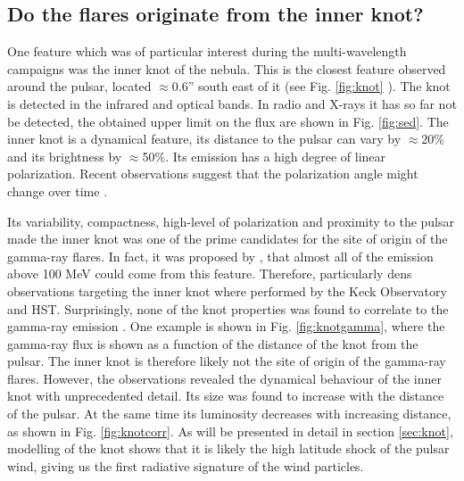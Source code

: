 \subsection{Do the flares originate from the inner knot?}
One feature which was of particular interest during the multi-wavelength campaigns was the inner knot of the nebula. This is the closest feature observed around the pulsar, located $\approx$0.6'' south east of it (see Fig. \ref{fig:knot} ). The knot is detected in the infrared and optical bands. In radio and X-rays it has so far not be detected, the obtained upper limit on the flux are shown in Fig. \ref{fig:sed}. The inner knot is a dynamical feature, its distance to the pulsar can vary by $\approx$20\% and its brightness by $\approx$50\%. Its emission has a high degree of linear polarization. Recent observations suggest that the polarization angle might change over time \citep{moran2015}.  

Its variability, compactness, high-level of polarization and  proximity to the pulsar made the inner knot was one of the prime candidates for the site of origin of the gamma-ray flares.
In fact, it was proposed by , that almost all of the emission above 100 MeV could come from this feature. Therefore, particularly dens observations targeting the inner knot where performed by the Keck Observatory and HST. Surprisingly, none of the knot properties was found to correlate to the gamma-ray emission \cite{rudy2015}. One example is shown in Fig. \ref{fig:knotgamma}, where the gamma-ray flux is shown as a function of the distance of the knot from the pulsar. The inner knot is therefore likely not the site of origin of the gamma-ray flares. However, the observations revealed the dynamical behaviour of the inner knot with unprecedented detail. Its size was found to increase with the distance of the pulsar. At the same time its luminosity decreases with increasing distance, as shown in Fig. \ref{fig:knotcorr}.  As will be presented in detail in section \ref{sec:knot}, modelling of the knot shows that it is likely the high latitude shock of the pulsar wind, giving us the first radiative signature of the wind particles.